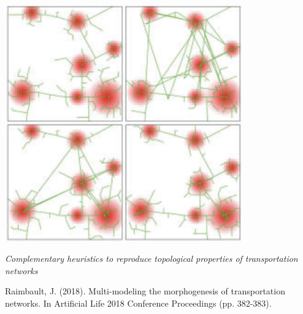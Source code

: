 \documentclass[english,11pt]{beamer}
\begin{document}
{\begin{columns}
\begin{column}{0.5\textwidth}
	\end{column}
	\vrule{}
	\begin{column}{0.5\textwidth}

	\begin{center}
		\includegraphics[width=0.8\textwidth]{figuresslides/nwmorphogenesis.png}
	\end{center}

	\medskip

	\footnotesize

	\textit{Complementary heuristics to reproduce topological properties of transportation networks}	

 	\medskip
	\tiny

	Raimbault, J. (2018). Multi-modeling the morphogenesis of transportation networks. In Artificial Life 2018 Conference Proceedings (pp. 382-383).

	\nocite{raimbault2018multi}

	\end{column}

\end{columns}	

}
\end{document}
